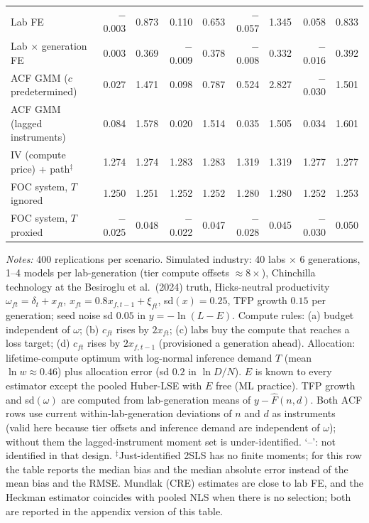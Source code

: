 \begin{table}[!htbp]
\begin{threeparttable}
\begin{tabular}{lrrrrrrrr}
Lab FE & $-$0.003 & 0.873 & 0.110 & 0.653 & $-$0.057 & 1.345 & 0.058 & 0.833 \\
Lab $\times$ generation FE & 0.003 & 0.369 & $-$0.009 & 0.378 & $-$0.008 & 0.332 & $-$0.016 & 0.392 \\
ACF GMM ($c$ predetermined) & 0.027 & 1.471 & 0.098 & 0.787 & 0.524 & 2.827 & $-$0.030 & 1.501 \\
ACF GMM (lagged instruments) & 0.084 & 1.578 & 0.020 & 1.514 & 0.035 & 1.505 & 0.034 & 1.601 \\
IV (compute price) + path$^{\ddagger}$ & 1.274 & 1.274 & 1.283 & 1.283 & 1.319 & 1.319 & 1.277 & 1.277 \\
FOC system, $T$ ignored & 1.250 & 1.251 & 1.252 & 1.252 & 1.280 & 1.280 & 1.252 & 1.253 \\
FOC system, $T$ proxied & $-$0.025 & 0.048 & $-$0.022 & 0.047 & $-$0.028 & 0.045 & $-$0.030 & 0.050 \\
\bottomrule
\end{tabular}
\begin{tablenotes}[flushleft]\footnotesize
\item \textit{Notes:} 400 replications per scenario. Simulated industry: 40 labs $\times$ 6 generations, 1--4 models per lab-generation (tier compute offsets $\approx 8\times$), Chinchilla technology at the Besiroglu et al.\ (2024) truth, Hicks-neutral productivity $\omega_{ft}=\delta_t+x_{ft}$, $x_{ft}=0.8x_{f,t-1}+\xi_{ft}$, sd$(x)=0.25$, TFP growth $0.15$ per generation; seed noise sd $0.05$ in $y=-\ln(L-E)$. Compute rules: (a) budget independent of $\omega$; (b) $c_{ft}$ rises by $2x_{ft}$; (c) labs buy the compute that reaches a loss target; (d) $c_{ft}$ rises by $2x_{f,t-1}$ (provisioned a generation ahead). Allocation: lifetime-compute optimum with log-normal inference demand $T$ (mean $\ln w\approx0.46$) plus allocation error (sd $0.2$ in $\ln D/N$). $E$ is known to every estimator except the pooled Huber-LSE with $E$ free (ML practice). TFP growth and sd$(\omega)$ are computed from lab-generation means of $y-\hat F(n,d)$. Both ACF rows use current within-lab-generation deviations of $n$ and $d$ as instruments (valid here because tier offsets and inference demand are independent of $\omega$); without them the lagged-instrument moment set is under-identified. `--': not identified in that design. $^{\ddagger}$Just-identified 2SLS has no finite moments; for this row the table reports the median bias and the median absolute error instead of the mean bias and the RMSE. Mundlak (CRE) estimates are close to lab FE, and the Heckman estimator coincides with pooled NLS when there is no selection; both are reported in the appendix version of this table.
\end{tablenotes}
\end{threeparttable}
\end{table}
